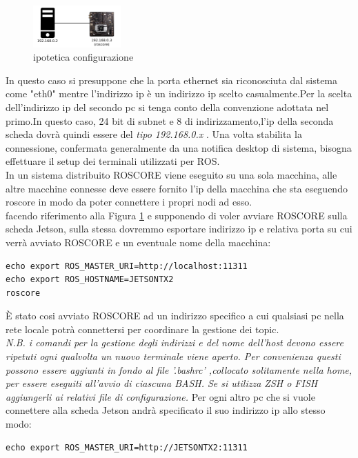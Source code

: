 \documentclass[a4paper]{article}
\begin{document}
\begin{figure}
    \centering
    \includegraphics [width=0.3\textwidth] {lanRos.png}
    \caption{ipotetica configurazione}
    \label{fig:lan}
\end{figure}

In questo caso si presuppone che la porta ethernet sia riconosciuta dal sistema come "eth0" mentre l'indirizzo ip è un indirizzo ip scelto casualmente.Per la scelta dell'indirizzo ip del secondo pc si tenga conto della convenzione adottata nel primo.In questo caso, 24 bit di subnet e 8 di indirizzamento,l'ip della seconda scheda dovrà quindi essere del \textit{tipo 192.168.0.x} .
Una volta stabilita la connessione, confermata generalmente da una notifica desktop di sistema, bisogna effettuare il setup dei terminali utilizzati per ROS.\\
In un sistema distribuito ROSCORE viene eseguito su una sola macchina, alle altre macchine connesse deve essere fornito l'ip della macchina che sta eseguendo roscore in modo da poter connettere i propri nodi ad esso.\\
facendo riferimento alla Figura \ref{fig:lan} e supponendo di voler avviare ROSCORE sulla scheda Jetson, sulla stessa dovremmo esportare indirizzo ip e relativa porta su cui verrà avviato ROSCORE e un eventuale nome della macchina:
\begin{verbatim}
echo export ROS_MASTER_URI=http://localhost:11311 
echo export ROS_HOSTNAME=JETSONTX2
roscore
\end{verbatim}
È stato cosi avviato ROSCORE ad un indirizzo specifico a cui qualsiasi pc nella rete locale potrà connettersi per coordinare la gestione dei topic.\\
\textit{
N.B. i comandi per la gestione degli indirizzi e del nome dell'host devono essere ripetuti ogni qualvolta un nuovo terminale viene aperto. Per convenienza questi possono essere aggiunti in fondo al file '.bashrc' ,collocato solitamente nella home, per essere eseguiti all'avvio di ciascuna BASH. Se si utilizza ZSH o FISH aggiungerli ai relativi file di configurazione. 
}
Per ogni altro pc che si vuole connettere alla scheda Jetson andrà specificato il suo indirizzo ip allo stesso modo:
\begin{verbatim}
echo export ROS_MASTER_URI=http://JETSONTX2:11311
\end{verbatim}
\end{document}
